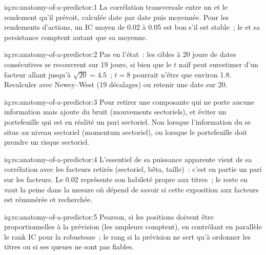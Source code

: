 \begin{solution}{iq:rs:anatomy-of-a-predictor:1}
La corrélation transversale entre un  et le rendement qu'il prévoit, calculée date par date puis moyennée. Pour les rendements d'actions, un
IC moyen de 0.02 à 0.05 est bon s'il est stable~; le  et sa persistance comptent autant que sa
moyenne.
\end{solution}

\begin{solution}{iq:rs:anatomy-of-a-predictor:2}
Pas en l'état~: les cibles à 20 jours de dates consécutives se recouvrent sur 19 jours, si bien que le $t$ naïf peut surestimer d'un facteur allant jusqu'à $\sqrt{20} = 4.5$~; $t = 8$ pourrait n'être que
environ 1.8. Recalculer avec Newey--West (19 décalages) ou retenir une date sur 20.
\end{solution}

\begin{solution}{iq:rs:anatomy-of-a-predictor:3}
Pour retirer une composante qui ne porte aucune information mais ajoute du bruit (mouvements sectoriels), et éviter un portefeuille qui est en
réalité un pari sectoriel. Non lorsque l'information du  se situe au niveau sectoriel (momentum sectoriel), ou lorsque le portefeuille doit prendre un
risque sectoriel.
\end{solution}

\begin{solution}{iq:rs:anatomy-of-a-predictor:4}
L'essentiel de sa puissance apparente vient de sa corrélation avec les facteurs retirés (sectoriel, bêta, taille)~: c'est en partie un pari sur les facteurs. Le 0.02 représente son habileté propre aux titres~; le reste en vaut la peine
dans la mesure où dépend de savoir si cette exposition aux facteurs est
rémunérée et recherchée.
\end{solution}

\begin{solution}{iq:rs:anatomy-of-a-predictor:5}
Pearson, si les positions doivent être proportionnelles à la prévision (les ampleurs comptent), en contrôlant en parallèle le rank IC pour la robustesse~; le rang
si la prévision ne sert qu'à ordonner les titres ou si ses queues ne sont pas fiables.
\end{solution}

